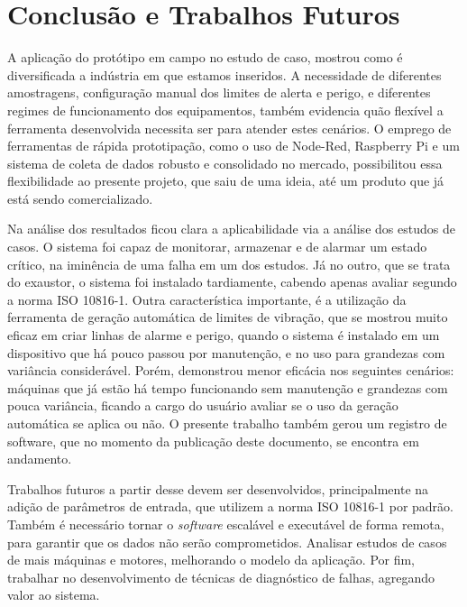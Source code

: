 \documentclass[a4paper]{ifacconf}
\begin{document}
\section{Conclusão e Trabalhos Futuros}

A aplicação do protótipo em campo no estudo de caso, mostrou como é diversificada a indústria em que estamos inseridos. 
A necessidade de diferentes amostragens, configuração manual dos limites de alerta e perigo, e diferentes regimes de funcionamento dos
equipamentos, também evidencia quão flexível a ferramenta desenvolvida necessita ser para atender estes cenários. O emprego de ferramentas de 
rápida prototipação, como o uso de Node-Red, Raspberry Pi e um sistema de coleta de dados robusto e consolidado no mercado, possibilitou essa 
flexibilidade ao presente projeto, que saiu de uma ideia, até um produto que já está sendo comercializado.

Na análise dos resultados ficou clara a aplicabilidade via a análise dos estudos de casos. O sistema foi
capaz de monitorar, armazenar e de alarmar um estado crítico, na iminência de uma falha em um dos estudos. Já no outro, que se trata do exaustor,
o sistema foi instalado tardiamente, cabendo apenas avaliar segundo a norma ISO 10816-1. Outra característica importante, é a utilização da
ferramenta de geração automática de limites de vibração, que se mostrou muito eficaz em criar linhas de alarme e perigo, quando o sistema é instalado em um dispositivo
que há pouco passou por manutenção, e no uso para grandezas com variância considerável. Porém, demonstrou menor eficácia nos seguintes cenários:
máquinas que já estão há tempo funcionando sem manutenção e grandezas com pouca variância, ficando a cargo do usuário avaliar se o uso da 
geração automática se aplica ou não. O presente trabalho também gerou um registro de software, que no momento da publicação deste  documento,
se encontra em andamento.

Trabalhos futuros a partir desse devem ser desenvolvidos, principalmente na adição de parâmetros de entrada, que utilizem a norma ISO 10816-1
por padrão. Também é necessário tornar o \textit{software} escalável e executável de forma remota, para garantir que os dados não serão comprometidos. Analisar estudos de 
casos de mais máquinas e motores, melhorando o modelo da aplicação. Por fim, trabalhar no desenvolvimento de técnicas de diagnóstico de falhas,
agregando valor ao sistema.

\end{document}
